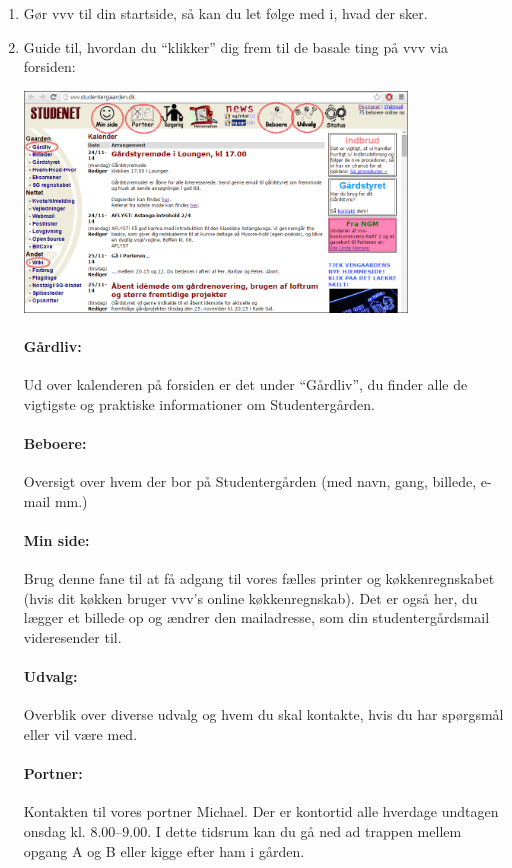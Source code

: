 \documentclass[11pt,article,twoside,openany,danish,extrafontsizes]{memoir} %
\begin{document}
\begin{enumerate}
	\item Gør vvv til din startside, så kan du let følge med i, hvad der sker.
	\item Guide til, hvordan du \enquote{klikker} dig frem til de basale ting på vvv via forsiden:

	\includegraphics[width=0.8\textwidth]{fig/vvv-beskrivelse}


		\paragraph{Gårdliv:} Ud over kalenderen på forsiden er det under \enquote{Gårdliv}, du finder alle de vigtigste og praktiske informationer om Studentergården.

		\paragraph{Beboere:} Oversigt over hvem der bor på Studentergården (med navn, gang, billede, e-mail mm.)

		\paragraph{Min side:} Brug denne fane til at få adgang til vores fælles printer og køkkenregnskabet (hvis dit køkken bruger vvv’s online køkkenregnskab). Det er også her, du lægger et billede op og ændrer den mailadresse, som din studentergårdsmail videresender til.

		\paragraph{Udvalg:} Overblik over diverse udvalg og hvem du skal kontakte, hvis du har spørgsmål eller vil være med.

		\paragraph{Portner:} Kontakten til vores portner Michael. Der er kontortid alle hverdage undtagen onsdag kl. 8.00–9.00. I dette tidsrum kan du gå ned ad trappen mellem opgang A og B eller kigge efter ham i gården.


\end{enumerate}
\end{document}
